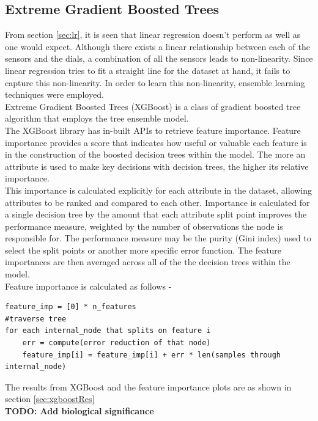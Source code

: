 \documentclass[12pt,chapterheads]{ucsd}
\begin{document}
\subsection{Extreme Gradient Boosted Trees}\label{sec:xgboost}
From section \ref{sec:lr}, it is seen that linear regression doesn't perform as well as one would expect. Although there exists a linear relationship between each of the sensors and the dials, a combination of all the sensors leads to non-linearity. Since linear regression tries to fit a straight line for the dataset at hand, it fails to capture this non-linearity. In order to learn this non-linearity, ensemble learning techniques were employed.\\
Extreme Gradient Boosted Trees \string(XGBoost) \cite{Chen:2016:XST:2939672.2939785} is a class of gradient boosted tree algorithm that employs the tree ensemble model.\\
The XGBoost library has in-built APIs to retrieve feature importance. Feature importance provides a score that indicates how useful or valuable each feature is in the construction of the boosted decision trees within the model. The more an attribute is used to make key decisions with decision trees, the higher its relative importance.\\
This importance is calculated explicitly for each attribute in the dataset, allowing attributes to be ranked and compared to each other. Importance is calculated for a single decision tree by the amount that each attribute split point improves the performance measure, weighted by the number of observations the node is responsible for. The performance measure may be the purity (Gini index) used to select the split points or another more specific error function. The feature importances are then averaged across all of the the decision trees within the model.\\
Feature importance is calculated as follows -
\begin{verbatim}
feature_imp = [0] * n_features
#traverse tree
for each internal_node that splits on feature i
    err = compute(error reduction of that node)
    feature_imp[i] = feature_imp[i] + err * len(samples through internal_node)
\end{verbatim}
The results from XGBoost and the feature importance plots are as shown in section \ref{sec:xgboostRes}\\
\textbf{TODO: Add biological significance}
\end{document}
